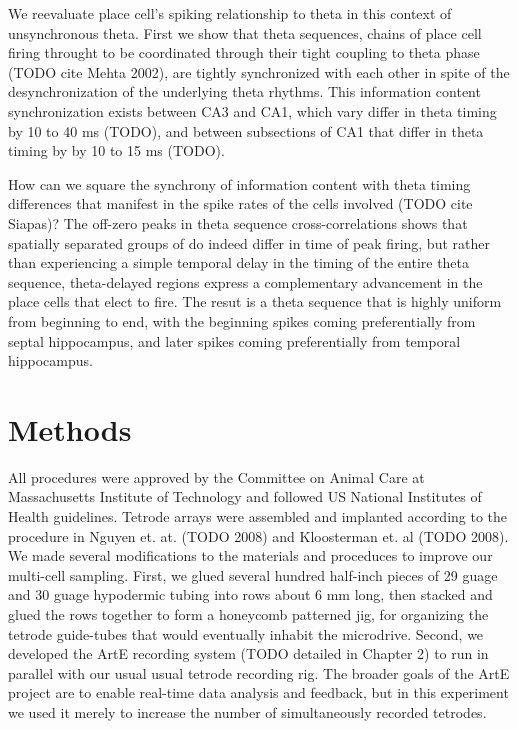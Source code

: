 \documentclass[10pt]{article}
\begin{document}
We reevaluate place cell's spiking relationship to theta in this context of unsynchronous theta. First we show that theta sequences, chains of place cell firing throught to be coordinated through their tight coupling to theta phase (TODO cite Mehta 2002), are tightly synchronized with each other in spite of the desynchronization of the underlying theta rhythms. This information content synchronization exists between CA3 and CA1, which vary differ in theta timing by 10 to 40 ms (TODO), and between subsections of CA1 that differ in theta timing by by 10 to 15 ms (TODO).

How can we square the synchrony of information content with theta timing differences that manifest in the spike rates of the cells involved (TODO cite Siapas)? The off-zero peaks in theta sequence cross-correlations shows that spatially separated groups of do indeed differ in time of peak firing, but rather than experiencing a simple temporal delay in the timing of the entire theta sequence, theta-delayed regions express a complementary advancement in the place cells that elect to fire. The resut is a theta sequence that is highly uniform from beginning to end, with the beginning spikes coming preferentially from septal hippocampus, and later spikes coming preferentially from temporal hippocampus.



\cite{Mizuseki 2012}


\section*{Methods}
All procedures were approved by the Committee on Animal Care at Massachusetts Institute of Technology and followed US National Institutes of Health guidelines. Tetrode arrays were assembled and implanted  according to the procedure in Nguyen et. at. (TODO 2008) and Kloosterman et. al (TODO 2008). We made several modifications to the materials and proceduces to improve our multi-cell sampling.  First, we glued several hundred half-inch pieces of 29 guage and 30 guage hypodermic tubing into rows about 6 mm long, then stacked and glued the rows together to form a honeycomb patterned jig, for organizing the tetrode guide-tubes that would eventually inhabit the microdrive. Second, we developed the ArtE recording system (TODO detailed in Chapter 2) to run in parallel with our usual usual tetrode recording rig. The broader goals of the ArtE project are to enable real-time data analysis and feedback, but in this experiment we used it merely to increase the number of simultaneously recorded tetrodes.
\end{document}
